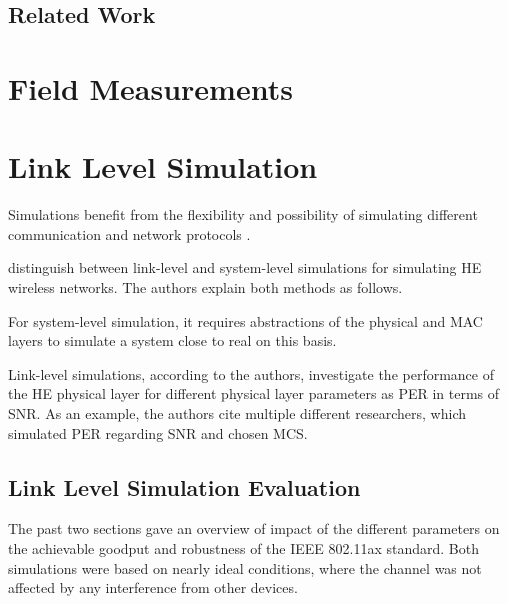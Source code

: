 \documentclass[]{nsm-thesis}
\begin{document}


\section{Related Work}





\chapter{Field Measurements}









\chapter{Link Level Simulation}

Simulations benefit from the flexibility and possibility of simulating different communication and network protocols \cite{kumar_simulators_2012}.

\textcite{omar_survey_2016} distinguish between link-level and system-level simulations for simulating \ac{HE} wireless networks.
The authors explain both methods as follows.

For system-level simulation, it requires abstractions of the physical and MAC layers to simulate a system close to
real on this basis.

Link-level simulations, according to the authors,
investigate the performance of the \ac{HE} physical layer for different physical layer parameters as \ac{PER} in terms of \ac{SNR}.
As an example, the authors cite multiple different researchers, which simulated \ac{PER} regarding \ac{SNR} and chosen \ac{MCS}.








\section{Link Level Simulation Evaluation}

The past two sections gave an overview of impact of the different parameters on the achievable goodput and robustness of the IEEE 802.11ax standard.
Both simulations were based on nearly ideal conditions, where the channel was not affected by any interference from other devices.
\end{document}
